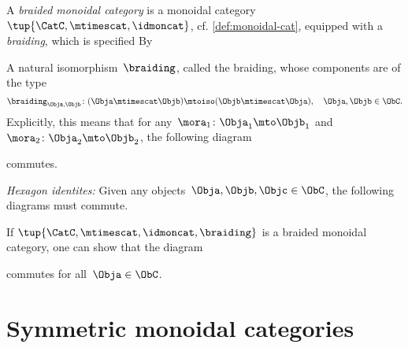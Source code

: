 \begin{ctdefinition}
    \label{def:braided_moncat}
    A \emph{braided monoidal category} is a monoidal category~$\tup{\CatC,\mtimescat,\idmoncat}$,  cf. \cref{def:monoidal-cat}, equipped with a \emph{braiding}, which is specified By
    
    \constit
    \begin{compactenum}
        \item A natural isomorphism~$\braiding$, called the braiding, whose components are of the type
        \begin{equation}
            \label{eq:braiding_symmetry}
            \braiding_{\Obja,\Objb}\colon (\Obja\mtimescat \Objb)\mtoiso (\Objb\mtimescat \Obja), \quad \Obja,\Objb \in \ObC.
        \end{equation}
        Explicitly, this means that for any~$\mora_1\colon \Obja_1\mto \Objb_1$ and~$\mora_2\colon \Obja_2\mto \Objb_2$, the following diagram
        \begin{center}
        \end{center}
        commutes.
    \end{compactenum}
    
    \condit
    \begin{compactenum}
        \item \emph{Hexagon identites:} Given any objects~$\Obja,\Objb,\Objc\in \ObC$, the following diagrams must commute.
    \end{compactenum}
    \begin{center}
    \end{center}
    \begin{center}
    \end{center}
\end{ctdefinition}

\begin{remark}
    If $\tup{\CatC,\mtimescat,\idmoncat, \braiding}$ is a braided monoidal category, one can show that the diagram
    \begin{center}
    \end{center}
    commutes for all~$\Obja \in \ObC$.
\end{remark}


\section{Symmetric monoidal categories}


